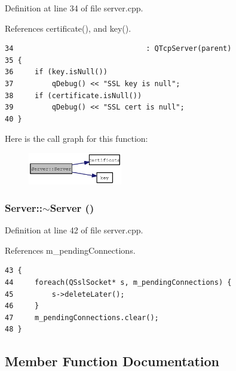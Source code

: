 Definition at line 34 of file server.cpp.

References certificate(), and key().

\begin{Code}\begin{verbatim}34                               : QTcpServer(parent)
35 {
36     if (key.isNull())
37         qDebug() << "SSL key is null";
38     if (certificate.isNull())
39         qDebug() << "SSL cert is null";
40 }
\end{verbatim}
\end{Code}




Here is the call graph for this function:\nopagebreak
\begin{figure}[H]
\begin{center}
\leavevmode
\includegraphics[width=116pt]{classServer_1950ac036d86af898428d7ba39bbf048_cgraph}
\end{center}
\end{figure}
\subsubsection{\setlength{\rightskip}{0pt plus 5cm}Server::$\sim$Server ()\hspace{0.3cm}{\tt  [virtual]}}\label{classServer_4b3aa2579cb1c8cd1d069582c14d0fa6}




Definition at line 42 of file server.cpp.

References m\_\-pendingConnections.

\begin{Code}\begin{verbatim}43 {
44     foreach(QSslSocket* s, m_pendingConnections) {
45         s->deleteLater();
46     }
47     m_pendingConnections.clear();
48 }
\end{verbatim}
\end{Code}




\subsection{Member Function Documentation}
